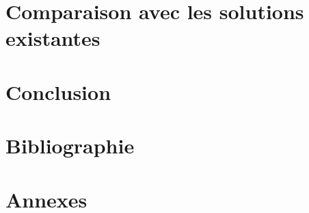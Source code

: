 \documentclass[12pt, a4paper, oneside]{article}
\begin{document}
\section{Comparaison avec les solutions existantes}
\section{Conclusion}
\section{Bibliographie}
%
%
\section{Annexes}
\end{document}
